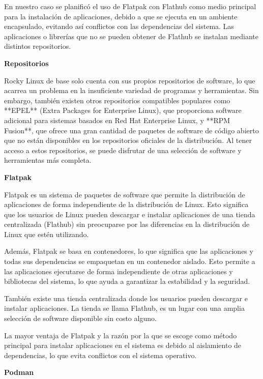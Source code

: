 \begin{doublespace}
    En nuestro caso se planificó el uso de Flatpak con Flathub como medio principal para la instalación de aplicaciones, debido a que se ejecuta en un ambiente encapsulado, evitando así conflictos con las dependencias del sistema. Las aplicaciones o librerías que no se pueden obtener de Flathub se instalan mediante distintos repositorios.

    \textbf{Repositorios}
    
    Rocky Linux de base solo cuenta con sus propios repositorios de software, lo que acarrea un problema en la insuficiente variedad de programas y herramientas. Sin embargo, también existen otros repositorios compatibles populares como **EPEL** (Extra Packages for Enterprise Linux), que proporciona software adicional para sistemas basados en Red Hat Enterprise Linux, y **RPM Fusion**, que ofrece una gran cantidad de paquetes de software de código abierto que no están disponibles en los repositorios oficiales de la distribución. Al tener acceso a estos repositorios, se puede disfrutar de una selección de software y herramientas más completa. \cite{RL-repo-1} \cite{RHEL-EPEL-1} \cite{rpmfusion-1}

    \textbf{Flatpak}
    
    Flatpak es un sistema de paquetes de software que permite la distribución de aplicaciones de forma independiente de la distribución de Linux. Esto significa que los usuarios de Linux pueden descargar e instalar aplicaciones de una tienda centralizada (Flathub) sin preocuparse por las diferencias en la distribución de Linux que estén utilizando.

    Además, Flatpak se basa en contenedores, lo que significa que las aplicaciones y todas sus dependencias se empaquetan en un contenedor aislado. Esto permite a las aplicaciones ejecutarse de forma independiente de otras aplicaciones y bibliotecas del sistema, lo que ayuda a garantizar la estabilidad y la seguridad.

    También existe una tienda centralizada donde los usuarios pueden descargar e instalar aplicaciones. La tienda se llama Flathub, es un lugar con una amplia selección de software disponible sin costo alguno.

    La mayor ventaja de Flatpak y la razón por la que se escoge como método principal para instalar aplicaciones en el sistema es debido al aislamiento de dependencias, lo que evita conflictos con el sistema operativo. \cite{FLAT-1} \cite{FLAT-2} \cite{RHEL-FLAT-1} \cite{PHOENIX-FLAT-1}

    \textbf{Podman}
    

\end{doublespace}
